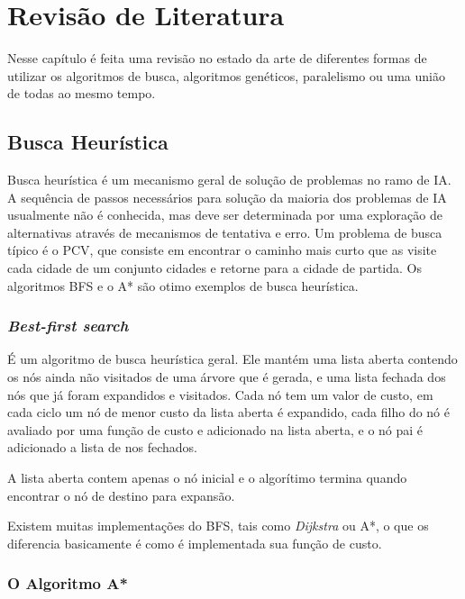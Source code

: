 \chapter[Revisão de Literatura]{Revisão de Literatura}


Nesse capítulo é feita uma revisão no estado da arte de diferentes formas de utilizar os algoritmos de busca, algoritmos genéticos, paralelismo ou uma união de todas ao mesmo tempo.

\section{Busca Heurística}

Busca heurística é um mecanismo geral de solução de problemas no ramo de IA. A sequência de passos necessários para solução da maioria dos problemas de IA usualmente não é conhecida, mas deve ser determinada por uma exploração de alternativas através de mecanismos de tentativa e erro. Um problema de busca típico é o PCV, que consiste em encontrar o caminho mais curto que as visite cada cidade de um conjunto cidades e retorne para a cidade de partida. Os algoritmos BFS e o A* são otimo exemplos de busca heurística.

\subsection{\textit{Best-first search}}

É um algoritmo de busca heurística geral. Ele mantém uma lista aberta contendo os nós ainda não visitados de uma árvore que é gerada, e uma lista fechada dos nós que já foram expandidos e visitados. Cada nó tem um valor de custo, em cada ciclo um nó de menor custo da lista aberta é expandido, cada filho do nó é avaliado por uma função de custo e adicionado na lista aberta, e o nó pai é adicionado a lista de nos fechados. 

A lista aberta contem apenas o nó inicial e o algorítimo termina quando encontrar o nó de destino para expansão.\cite{KORF199341}

Existem muitas implementações do BFS, tais como \textit{Dijkstra} ou A*, o que os diferencia basicamente é como é implementada sua função de custo.

\subsection{O Algoritmo A*}

